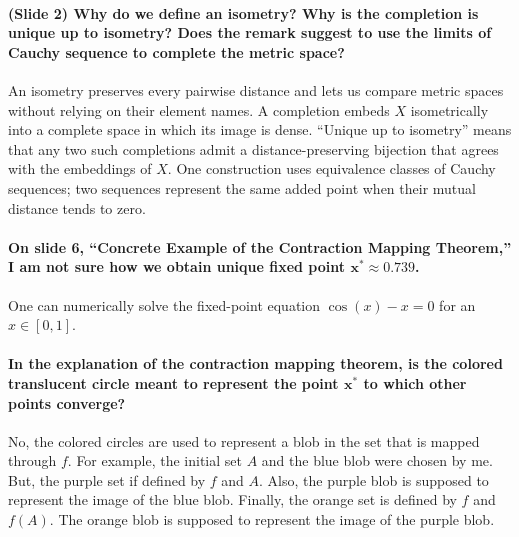 \documentclass[10pt,english]{article}
\begin{document}
\paragraph{(Slide 2) Why do we define an isometry?  Why is the completion is unique up to isometry? Does the remark suggest to use the limits of Cauchy sequence to complete the metric space? }


An isometry preserves every pairwise distance and lets us compare metric spaces without relying on their element names.
A completion embeds $X$ isometrically into a complete space in which its image is dense.
``Unique up to isometry'' means that any two such completions admit a distance-preserving bijection that agrees with the embeddings of $X$.
One construction uses equivalence classes of Cauchy sequences; two sequences represent the same added point when their mutual distance tends to zero.


\paragraph{On slide 6, ``Concrete Example of the Contraction Mapping Theorem,'' I am not sure how we obtain unique fixed point $\boldsymbol{x^* \approx 0.739}$.}

One can numerically solve the fixed-point equation $\cos(x)-x=0$ for an $x\in[0,1]$.

\paragraph{In the explanation of the contraction mapping theorem, is the colored translucent circle meant to represent the point $\boldsymbol{x^*}$ to which other points converge?}

No, the colored circles are used to represent a blob in the set that is mapped through $f$.
For example, the initial set $A$ and the blue blob were chosen by me.
But, the purple set if defined by $f$ and $A$.
Also, the purple blob is supposed to represent the image of the blue blob.
Finally, the orange set is defined by $f$ and $f(A)$.
The orange blob is supposed to represent the image of the purple blob.
\end{document}
